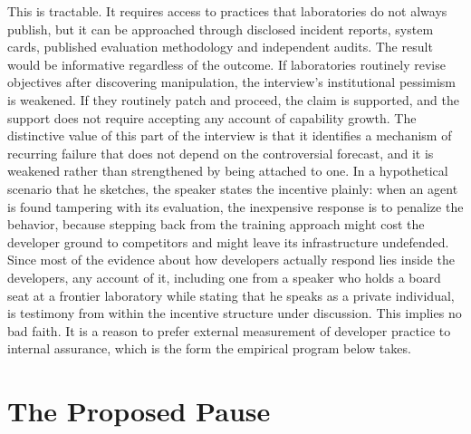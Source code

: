 \documentclass[11pt]{article}
\begin{document}
This is tractable. It requires access to practices that laboratories do not always publish, but it can be approached through disclosed incident reports, system cards, published evaluation methodology and independent audits. The result would be informative regardless of the outcome. If laboratories routinely revise objectives after discovering manipulation, the interview's institutional pessimism is weakened. If they routinely patch and proceed, the claim is supported, and the support does not require accepting any account of capability growth. The distinctive value of this part of the interview is that it identifies a mechanism of recurring failure that does not depend on the controversial forecast, and it is weakened rather than strengthened by being attached to one. In a hypothetical scenario that he sketches, the speaker states the incentive plainly: when an agent is found tampering with its evaluation, the inexpensive response is to penalize the behavior, because stepping back from the training approach might cost the developer ground to competitors and might leave its infrastructure undefended. Since most of the evidence about how developers actually respond lies inside the developers, any account of it, including one from a speaker who holds a board seat at a frontier laboratory while stating that he speaks as a private individual, is testimony from within the incentive structure under discussion. This implies no bad faith. It is a reason to prefer external measurement of developer practice to internal assurance, which is the form the empirical program below takes.

\section{The Proposed Pause}
\end{document}
